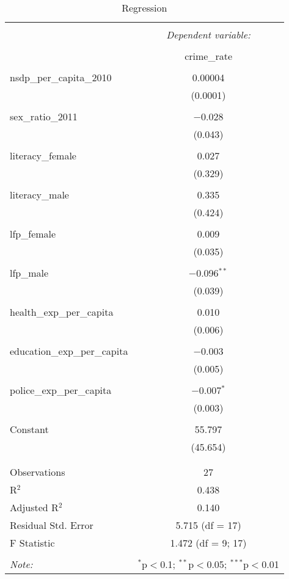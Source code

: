 
\begin{table}[!htbp] \centering 
  \caption{Regression} 
  \label{} 
\begin{tabular}{@{\extracolsep{5pt}}lc} 
\\[-1.8ex]\hline 
\hline \\[-1.8ex] 
 & \multicolumn{1}{c}{\textit{Dependent variable:}} \\ 
\cline{2-2} 
\\[-1.8ex] & crime\_rate \\ 
\hline \\[-1.8ex] 
 nsdp\_per\_capita\_2010 & 0.00004 \\ 
  & (0.0001) \\ 
  & \\ 
 sex\_ratio\_2011 & $-$0.028 \\ 
  & (0.043) \\ 
  & \\ 
 literacy\_female & 0.027 \\ 
  & (0.329) \\ 
  & \\ 
 literacy\_male & 0.335 \\ 
  & (0.424) \\ 
  & \\ 
 lfp\_female & 0.009 \\ 
  & (0.035) \\ 
  & \\ 
 lfp\_male & $-$0.096$^{**}$ \\ 
  & (0.039) \\ 
  & \\ 
 health\_exp\_per\_capita & 0.010 \\ 
  & (0.006) \\ 
  & \\ 
 education\_exp\_per\_capita & $-$0.003 \\ 
  & (0.005) \\ 
  & \\ 
 police\_exp\_per\_capita & $-$0.007$^{*}$ \\ 
  & (0.003) \\ 
  & \\ 
 Constant & 55.797 \\ 
  & (45.654) \\ 
  & \\ 
\hline \\[-1.8ex] 
Observations & 27 \\ 
R$^{2}$ & 0.438 \\ 
Adjusted R$^{2}$ & 0.140 \\ 
Residual Std. Error & 5.715 (df = 17) \\ 
F Statistic & 1.472 (df = 9; 17) \\ 
\hline 
\hline \\[-1.8ex] 
\textit{Note:}  & \multicolumn{1}{r}{$^{*}$p$<$0.1; $^{**}$p$<$0.05; $^{***}$p$<$0.01} \\ 
\end{tabular} 
\end{table} 
